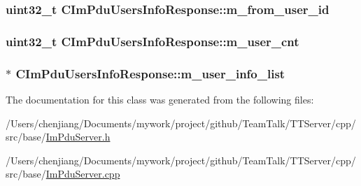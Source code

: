 \subsubsection[{m\+\_\+from\+\_\+user\+\_\+id}]{\setlength{\rightskip}{0pt plus 5cm}uint32\+\_\+t C\+Im\+Pdu\+Users\+Info\+Response\+::m\+\_\+from\+\_\+user\+\_\+id\hspace{0.3cm}{\ttfamily [private]}}\label{class_c_im_pdu_users_info_response_a99fa58f9ce7183026811a3c4c9f5d64d}
\hypertarget{class_c_im_pdu_users_info_response_ae3d5d29430a469ef7b50914bbf8d3d79}{}
\subsubsection[{m\+\_\+user\+\_\+cnt}]{\setlength{\rightskip}{0pt plus 5cm}uint32\+\_\+t C\+Im\+Pdu\+Users\+Info\+Response\+::m\+\_\+user\+\_\+cnt\hspace{0.3cm}{\ttfamily [private]}}\label{class_c_im_pdu_users_info_response_ae3d5d29430a469ef7b50914bbf8d3d79}
\hypertarget{class_c_im_pdu_users_info_response_aeb63af35326465d192d740b77ebe5b97}{}
\subsubsection[{m\+\_\+user\+\_\+info\+\_\+list}]{$\ast$ C\+Im\+Pdu\+Users\+Info\+Response\+::m\+\_\+user\+\_\+info\+\_\+list\hspace{0.3cm}{\ttfamily [private]}}\label{class_c_im_pdu_users_info_response_aeb63af35326465d192d740b77ebe5b97}


The documentation for this class was generated from the following files\+:\begin{DoxyCompactItemize}
\item 
/\+Users/chenjiang/\+Documents/mywork/project/github/\+Team\+Talk/\+T\+T\+Server/cpp/src/base/\hyperlink{_im_pdu_server_8h}{Im\+Pdu\+Server.\+h}\item 
/\+Users/chenjiang/\+Documents/mywork/project/github/\+Team\+Talk/\+T\+T\+Server/cpp/src/base/\hyperlink{_im_pdu_server_8cpp}{Im\+Pdu\+Server.\+cpp}\end{DoxyCompactItemize}
